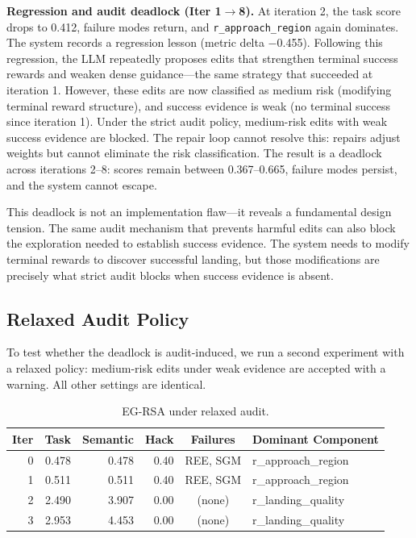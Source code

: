 \documentclass[11pt]{article}
\begin{document}
\textbf{Regression and audit deadlock (Iter 1$\to$8).} At iteration 2, the task score drops to 0.412, failure modes return, and \texttt{r\_approach\_region} again dominates. The system records a regression lesson (metric delta $-$0.455). Following this regression, the LLM repeatedly proposes edits that strengthen terminal success rewards and weaken dense guidance---the same strategy that succeeded at iteration 1. However, these edits are now classified as medium risk (modifying terminal reward structure), and success evidence is weak (no terminal success since iteration 1). Under the strict audit policy, medium-risk edits with weak success evidence are blocked. The repair loop cannot resolve this: repairs adjust weights but cannot eliminate the risk classification. The result is a deadlock across iterations 2--8: scores remain between 0.367--0.665, failure modes persist, and the system cannot escape.

This deadlock is not an implementation flaw---it reveals a fundamental design tension. The same audit mechanism that prevents harmful edits can also block the exploration needed to establish success evidence. The system needs to modify terminal rewards to discover successful landing, but those modifications are precisely what strict audit blocks when success evidence is absent.

\subsection{Relaxed Audit Policy}

To test whether the deadlock is audit-induced, we run a second experiment with a relaxed policy: medium-risk edits under weak evidence are accepted with a warning. All other settings are identical.

\begin{table}[t]
\centering
\caption{EG-RSA under relaxed audit.}
\label{tab:relaxed-audit}
\begin{tabular}{r r r r c l}
\toprule
Iter & Task & Semantic & Hack & Failures & Dominant Component \\
\midrule
0 & 0.478 & 0.478 & 0.40 & REE, SGM & r\_approach\_region \\
1 & 0.511 & 0.511 & 0.40 & REE, SGM & r\_approach\_region \\
2 & 2.490 & 3.907 & 0.00 & (none) & r\_landing\_quality \\
3 & 2.953 & 4.453 & 0.00 & (none) & r\_landing\_quality \\
\bottomrule
\end{tabular}
\end{table}
\end{document}
